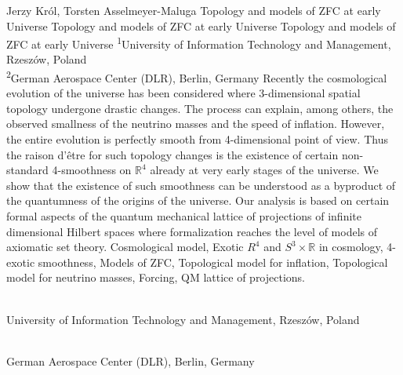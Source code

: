 \begin{artengenv2auth}{Jerzy Kr\'ol, Torsten Asselmeyer-Maluga}
	{Topology and models of ZFC at early Universe}
	{Topology and models of ZFC at early Universe}
	{Topology and models of ZFC at early Universe}
	{\textsuperscript{1}University of Information Technology and Management, Rzesz\'ow, Poland\\
		\textsuperscript{2}German Aerospace Center (DLR), Berlin, Germany}
	{Recently the cosmological evolution of the universe has been considered where 3-dimensional spatial topology undergone drastic changes. The process can explain, among others, the observed smallness of the neutrino masses and the speed of inflation. However, the entire evolution is perfectly smooth from 4-dimensional point of view. Thus the raison d'{\^e}tre for such topology changes is the existence of certain non-standard 4-smoothness on $\mathbb{R}^4$ already at very early stages of the universe. 
		We show that the existence of such smoothness can be understood as a byproduct of the quantumness of the origins of the universe. Our analysis is based on certain formal aspects of the quantum mechanical lattice of projections of infinite dimensional Hilbert spaces where formalization reaches the level of models of axiomatic set theory. }
	{Cosmological model, Exotic $R^4$ and $S^3 \times \mathbb{R}$ in cosmology, 4-exotic smoothness, Models of ZFC, Topological model for inflation, Topological model for neutrino masses, Forcing, QM lattice of projections.}
	{%
		{\flushright{}\\\subsubsectit\small{University of Information Technology and Management, Rzesz\'ow, Poland}\par}%
		{\flushright{}\\\subsubsectit\small{German Aerospace Center (DLR), Berlin, Germany}\par}%
	}










\end{artengenv2auth}

